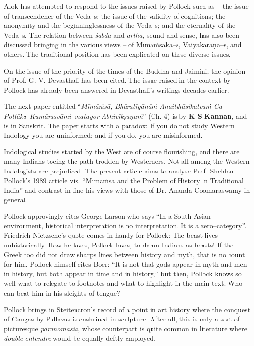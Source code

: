 Alok has attempted to respond to the issues raised by Pollock such as – the issue of transcendence of the Veda–s; the issue of the validity of cognitions; the anonymity and the beginninglessness of the Veda–s; and the eternality of the Veda–s. The relation between \textit{śabda} and \textit{artha}, sound and sense, has also been discussed bringing in the various views – of Mīmāṁsaka–s, Vaiyākaraṇa–s, and others. The traditional position has been explicated on these diverse issues.

On the issue of the priority of the times of the Buddha and Jaimini, the opinion of Prof. G. V. Devasthali has been cited. The issue raised in the context by Pollock has already been answered in Devasthali’s writings decades earlier. 

The next paper entitled “\textit{Mīmāṁsā, Bhāratīyānāṁ Anaitihāsikatvaṁ Ca – Pollāka–Kumārasvāmi–matayor Abhivīkṣaṇaṁ}” (Ch. 4) is by \textbf{K S Kannan}, and is in Sanskrit. The paper starts with a paradox: If you do not study Western Indology you are uninformed; and if you do, you are misinformed.

Indological studies started by the West are of course flourishing, and there are many Indians toeing the path trodden by Westerners. Not all among the Western Indologists are prejudiced. The present article aims to analyse Prof. Sheldon Pollock’s 1989 article viz. “Mīmāṁsā and the Problem of History in Traditional India” and contrast in fine his views with those of Dr. Ananda Coomaraswamy in general.

 Pollock approvingly cites George Larson who says “In a South Asian environment, historical interpretation is no interpretation. It is a zero–category”. Friedrich Nietzsche’s quote comes in handy for Pollock: The beast lives unhistorically. How he loves, Pollock loves, to damn Indians as beasts! If the Greek too did not draw sharps lines between history and myth, that is no count for him. Pollock himself cites Boer: “It is not that gods appear in myth and men in history, but both appear in time and in history,” but then, Pollock knows so well what to relegate to footnotes and what to highlight in the main text. Who can beat him in his sleights of tongue?

Pollock brings in Steitencron’s record of a point in art history where the conquest of Gangas by Pallavas is enshrined in sculpture. After all, this is only a sort of picturesque \textit{paronomasia}, whose counterpart is quite common in literature where \textit{double entendre} would be equally deftly employed. 

